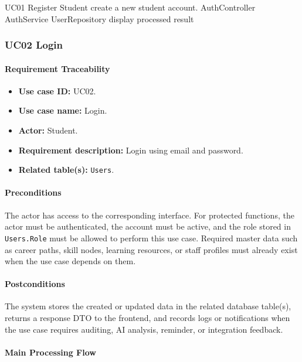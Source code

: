 \SequenceDiagram
{UC01 Register}
{Student}
{create a new student account.}
{AuthController}
{AuthService}
{UserRepository}
{display processed result}

\subsubsection{UC02 Login}

\paragraph{Requirement Traceability}

\begin{itemize}
    \item \textbf{Use case ID:} UC02.
    \item \textbf{Use case name:} Login.
    \item \textbf{Actor:} Student.
    \item \textbf{Requirement description:} Login using email and password.
    \item \textbf{Related table(s):} \texttt{Users}.
\end{itemize}

\paragraph{Preconditions}

The actor has access to the corresponding interface. For protected functions, the actor must be authenticated, the account must be active, and the role stored in \texttt{Users.Role} must be allowed to perform this use case. Required master data such as career paths, skill nodes, learning resources, or staff profiles must already exist when the use case depends on them.

\paragraph{Postconditions}

The system stores the created or updated data in the related database table(s), returns a response DTO to the frontend, and records logs or notifications when the use case requires auditing, AI analysis, reminder, or integration feedback.

\paragraph{Main Processing Flow}

